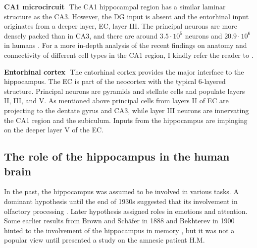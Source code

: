     \textbf{CA1 microcircuit}\,\,
    The CA1 hippocampal region has a similar laminar structure as the CA3.
    However, the DG input is absent and the entorhinal input originates from a deeper
    layer, EC, layer III. The principal neurons are more densely packed than in
    CA3, and there are around $3.5\cdot 10^5$ neurons \citep{West1991} and $20.9
    \cdot 10^6$ in humans \citep{Simic1997}. For a more in-depth analysis of
    the recent findings on anatomy and connectivity of different cell types in
    the CA1 region, I kindly refer the reader to \cite{Bezaire2013}.

    \textbf{Entorhinal cortex}\,\,
    The entorhinal cortex provides the major interface to the hippocampus. The
    EC is part of the neocortex with the typical 6-layered structure. Principal
    neurons are pyramids and stellate cells and populate layers II, III, and V.
    As mentioned above principal cells from layers II of EC are projecting to
    the dentate gyrus and CA3, while layer III neurons are innervating the CA1
    region and the subiculum. Inputs from the hippocampus are impinging on the
    deeper layer V of the EC.


  \subsection{The role of the hippocampus in the human brain}
    In the past, the hippocampus was assumed to be involved in various tasks. A
    dominant hypothesis until the end of 1930s suggested that its involvement
    in olfactory processing \citep{Andersen2007}. Later hypothesis assigned
    roles in emotions and attention. Some earlier results from Brown and
    Sch\"{a}fer in 1888 and Bekhterev in 1900 hinted to the involvement of the
    hippocampus in memory \citep{Andersen2007}, but it was not a popular view
    until \cite{Scoville1957} presented a study on the amnesic patient H.M.

